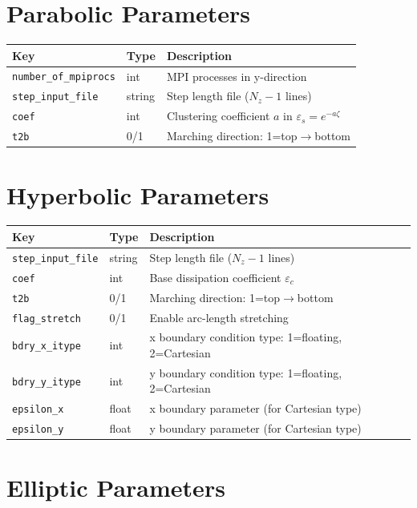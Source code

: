\documentclass[11pt,a4paper]{report}
\begin{document}
\section{Parabolic Parameters}

\begin{longtable}{p{5.5cm} p{2cm} p{7cm}}
\toprule
\textbf{Key} & \textbf{Type} & \textbf{Description} \\
\midrule
\texttt{number\_of\_mpiprocs} & int & MPI processes in y-direction \\
\texttt{step\_input\_file} & string & Step length file ($N_z-1$ lines) \\
\texttt{coef} & int & Clustering coefficient $a$ in $\varepsilon_s = e^{-a\zeta}$ \\
\texttt{t2b} & 0/1 & Marching direction: 1=top$\to$bottom \\
\bottomrule
\end{longtable}

\section{Hyperbolic Parameters}

\begin{longtable}{p{5.5cm} p{2cm} p{7cm}}
\toprule
\textbf{Key} & \textbf{Type} & \textbf{Description} \\
\midrule
\texttt{step\_input\_file} & string & Step length file ($N_z-1$ lines) \\
\texttt{coef} & int & Base dissipation coefficient $\varepsilon_c$ \\
\texttt{t2b} & 0/1 & Marching direction: 1=top$\to$bottom \\
\texttt{flag\_stretch} & 0/1 & Enable arc-length stretching \\
\texttt{bdry\_x\_itype} & int & x boundary condition type: 1=floating, 2=Cartesian \\
\texttt{bdry\_y\_itype} & int & y boundary condition type: 1=floating, 2=Cartesian \\
\texttt{epsilon\_x} & float & x boundary parameter (for Cartesian type) \\
\texttt{epsilon\_y} & float & y boundary parameter (for Cartesian type) \\
\bottomrule
\end{longtable}

\section{Elliptic Parameters}
\end{document}
